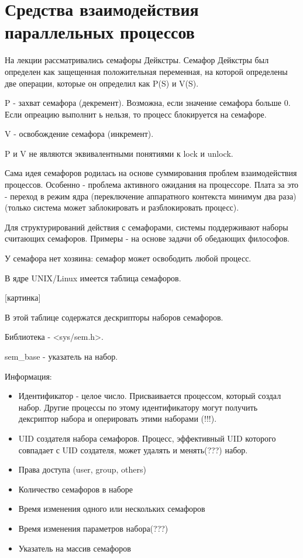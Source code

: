 \documentclass[a4paper, 12pt]{report}
\begin{document}
	\section*{Средства взаимодействия параллельных процессов}
	
	На лекции рассматривались семафоры Дейкстры. Семафор Дейкстры был определен как защещенная положительная переменная, на которой определены две операции, которые он определил как P(S) и V(S).
	
	P - захват семафора (декремент). Возможна, если значение семафора больше 0. Если опреацию выполнит ь нельзя, то процесс блокируется на семафоре.
	
	V - освобождение семафора (инкремент).
	
	P и V не являются эквивалентными понятиями к lock и unlock.
	
	Сама идея семафоров родилась на основе суммирования проблем взаимодействия процессов. Особенно - проблема активного ожидания на процессоре. Плата за это - переход в режим ядра (переключение аппаратного контекста минимум два раза) (только система может заблокировать и разблокировать процесс).
	
	Для структурирований действия с семафорами, системы поддерживают наборы считающих семафоров. Примеры - на основе задачи об обедающих философов.
	
	У семафора нет хозяина: семафор может освободить любой процесс.
	
	В ядре UNIX/Linux имеется таблица семафоров.
	
	[картинка]
	
	В этой таблице содержатся дескрипторы наборов семафоров.
	
	Библиотека - <sys/sem.h>.
	
	sem\_base - указатель на набор.
	
	Информация:
	
	\begin{itemize}
		\item Идентификатор - целое число. Присваивается процессом, который создал набор. Другие процессы по этому идентификатору могут получить дексриптор набора и оперировать этими наборами (!!!).
		
		\item UID создателя набора семафоров. Процесс, эффективный UID которого совпадает с UID создателя, может удалять и менять(???) набор.
		
		\item Права доступа (user, group, others)
		
		\item Количество семафоров в наборе
		
		\item Время изменения одного или нескольких семафоров
		
		\item Время изменения параметров набора(???)
		
		\item Указатель на массив семафоров
	\end{itemize}
\end{document}
